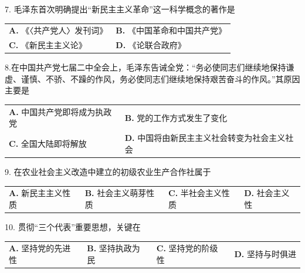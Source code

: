 \documentclass[UTF8,11pt]{ctexart}
\begin{document}
7. 毛泽东首次明确提出“新民主主义革命”这一科学概念的著作是


\begin{center}\begin{tabular}{>{\raggedright\arraybackslash}p{\dimexpr(\linewidth-4\tabcolsep)/2\relax}>{\raggedright\arraybackslash}p{\dimexpr(\linewidth-4\tabcolsep)/2\relax}}
\textbf{A.} 《〈共产党人〉发刊词》 & \textbf{B.} 《中国革命和中国共产党》\\[.35em]
\textbf{C.} 《新民主主义论》 & \textbf{D.} 《论联合政府》\\[.35em]\end{tabular}\end{center}

8.在中国共产党七届二中全会上，毛泽东告诫全党：“务必使同志们继续地保持谦虚、谨慎、不骄、不躁的作风，务必使同志们继续地保持艰苦奋斗的作风。”其原因主要是


\begin{center}\begin{tabular}{>{\raggedright\arraybackslash}p{\dimexpr(\linewidth-4\tabcolsep)/2\relax}>{\raggedright\arraybackslash}p{\dimexpr(\linewidth-4\tabcolsep)/2\relax}}
\textbf{A.} 中国共产党即将成为执政党 & \textbf{B.} 党的工作方式发生了变化\\[.35em]
\textbf{C.} 全国大陆即将解放 & \textbf{D.} 中国将由新民主主义社会转变为社会主义社会\\[.35em]\end{tabular}\end{center}

9. 在农业社会主义改造中建立的初级农业生产合作社属于


\begin{center}\begin{tabular}{>{\raggedright\arraybackslash}p{\dimexpr(\linewidth-8\tabcolsep)/4\relax}>{\raggedright\arraybackslash}p{\dimexpr(\linewidth-8\tabcolsep)/4\relax}>{\raggedright\arraybackslash}p{\dimexpr(\linewidth-8\tabcolsep)/4\relax}>{\raggedright\arraybackslash}p{\dimexpr(\linewidth-8\tabcolsep)/4\relax}}
\textbf{A.} 新民主主义性质 & \textbf{B.} 社会主义萌芽性质 & \textbf{C.} 半社会主义性质 & \textbf{D.} 社会主义性\\[.35em]\end{tabular}\end{center}

10. 贯彻“三个代表”重要思想，关键在


\begin{center}\begin{tabular}{>{\raggedright\arraybackslash}p{\dimexpr(\linewidth-8\tabcolsep)/4\relax}>{\raggedright\arraybackslash}p{\dimexpr(\linewidth-8\tabcolsep)/4\relax}>{\raggedright\arraybackslash}p{\dimexpr(\linewidth-8\tabcolsep)/4\relax}>{\raggedright\arraybackslash}p{\dimexpr(\linewidth-8\tabcolsep)/4\relax}}
\textbf{A.} 坚持党的先进性 & \textbf{B.} 坚持执政为民 & \textbf{C.} 坚持党的阶级性 & \textbf{D.} 坚持与时俱进\\[.35em]\end{tabular}\end{center}
\end{document}
